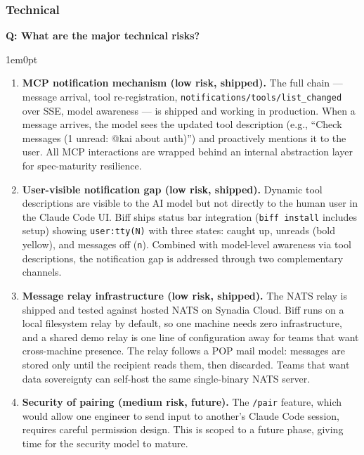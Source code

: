 \documentclass[11pt,letterpaper]{article}
\newcounter{faqnum}
\newenvironment{faqpair}[1]{%
  \needspace{4\baselineskip}%
  \vspace{0.5em}%
  \refstepcounter{faqnum}%
  \noindent\textbf{\color{SectionBlue}Q\thefaqnum: #1}\par\nopagebreak[4]%
  \vspace{0.2em}%
  \begin{adjustwidth}{1em}{0pt}%
  \setlength{\parindent}{0pt}%
}{%
  \end{adjustwidth}%
  \vspace{0.5em}%
}
\begin{document}
\subsubsection*{Technical}

\begin{faqpair}{What are the major technical risks?}\label{faq:tech-risks}
  \begin{enumerate}[leftmargin=1.5em]
    \item \textbf{MCP notification mechanism (low risk, shipped).} The
    full chain --- message arrival, tool re-registration,
    \texttt{notifications/tools/list\_changed} over SSE, model
    awareness --- is shipped and working in production. When a message
    arrives, the model sees the updated tool description (e.g., ``Check
    messages (1 unread: @kai about auth)'') and proactively mentions it
    to the user. All MCP interactions are wrapped behind an internal
    abstraction layer for spec-maturity resilience.

    \item \textbf{User-visible notification gap (low risk, shipped).}
    Dynamic tool descriptions are visible to the AI model but
    not directly to the human user in the Claude Code UI. Biff ships
    status bar integration (\texttt{biff install} includes setup) showing
    \texttt{user:tty(N)} with three states: caught up, unreads (bold
    yellow), and messages off (\texttt{n}). Combined with model-level
    awareness via tool descriptions, the notification gap is addressed
    through two complementary channels.

    \item \textbf{Message relay infrastructure (low risk, shipped).}
    The NATS relay is shipped and tested against hosted NATS on Synadia
    Cloud. Biff runs on a local filesystem relay by default, so one
    machine needs zero infrastructure, and a shared demo relay is one
    line of configuration away for teams that want cross-machine presence.
    The relay follows a POP mail model: messages are
    stored only until the recipient reads them, then discarded. Teams
    that want data sovereignty can self-host the same single-binary NATS
    server.

    \item \textbf{Security of pairing (medium risk, future).} The
    \texttt{/pair} feature, which would allow one engineer to send input
    to another's Claude Code session, requires careful permission design.
    This is scoped to a future phase, giving time for the security model
    to mature.


\end{enumerate}
\end{faqpair}
\end{document}
